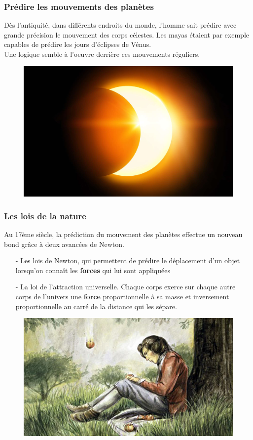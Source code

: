 \documentclass[11pt]{beamer}
\begin{document}
	
	\begin{frame}
		\frametitle{Prédire les mouvements des planètes}
		Dès l'antiquité, dans différents endroits du monde, l'homme sait prédire avec grande précision le mouvement des corps célestes. Les mayas étaient par exemple capables de prédire les jours d'éclipses de Vénus. \\
		
		Une logique semble à l'oeuvre derrière ces mouvements réguliers. \\
		\begin{figure}
			\includegraphics[scale=0.1]{eclipse}
		\end{figure}
	\end{frame}
	\begin{frame}
		\frametitle{Les lois de la nature}
		Au 17ème siècle, la prédiction du mouvement des planètes effectue un nouveau bond grâce à deux avancées de Newton. 
		
		\begin{itemize}
			\item[-] Les lois de Newton, qui permettent de prédire le déplacement d'un objet lorsqu'on connaît les \textbf{forces} qui lui sont appliquées
			\item[-] La loi de l'attraction universelle. Chaque corps exerce sur chaque autre corps de l'univers une \textbf{force} proportionnelle à sa masse et inversement proportionnelle au carré de la distance qui les sépare. 
		\end{itemize}
		\begin{figure}
			\includegraphics[scale = 2]{newton}
		\end{figure}
	\end{frame}
\end{document}
